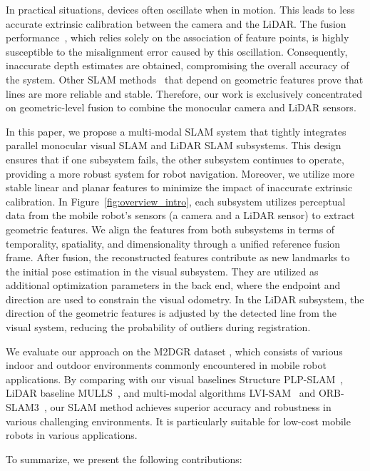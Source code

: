 %
In practical situations, devices often oscillate when in motion. This leads to less accurate extrinsic calibration between the camera and the LiDAR. The fusion performance~\cite{graeter2018limo}, which relies solely on the association of feature points, is highly susceptible to the misalignment error caused by this oscillation. Consequently, inaccurate depth estimates are obtained, compromising the overall accuracy of the system.
Other SLAM methods~\cite{fang2020visual, lee2021plf, pumarola2017pl} that depend on geometric features prove that lines are more reliable and stable. Therefore, our work is exclusively concentrated on geometric-level fusion to combine the monocular camera and LiDAR sensors.

In this paper, we propose a multi-modal SLAM system that tightly integrates parallel monocular visual SLAM and LiDAR SLAM subsystems. This design ensures that if one subsystem fails, the other subsystem continues to operate, providing a more robust system for robot navigation. Moreover, we utilize more stable linear and planar features to minimize the impact of inaccurate extrinsic calibration. In Figure~\ref{fig:overview_intro}, each subsystem utilizes perceptual data from the mobile robot's sensors (a camera and a LiDAR sensor) to extract geometric features. We align the features from both subsystems in terms of temporality, spatiality, and dimensionality through a unified reference fusion frame. After fusion, the reconstructed features contribute as new landmarks to the initial pose estimation in the visual subsystem. They are utilized as additional optimization parameters in the back end, where the endpoint and direction are used to constrain the visual odometry. In the LiDAR subsystem, the direction of the geometric features is adjusted by the detected line from the visual system, reducing the probability of outliers during registration.

We evaluate our approach on the M2DGR dataset \cite{yin2021m2dgr}, which consists of various indoor and outdoor environments commonly encountered in mobile robot applications. By comparing with our visual baselines Structure PLP-SLAM~\cite{shu2022structure}, LiDAR baseline MULLS~\cite{pan2021mulls}, and multi-modal algorithms LVI-SAM~\cite{shan2021lvi} and ORB-SLAM3~\cite{campos2021orb}, our SLAM method achieves superior accuracy and robustness in various challenging environments. It is particularly suitable for low-cost mobile robots in various applications.

To summarize, we present the following contributions:

